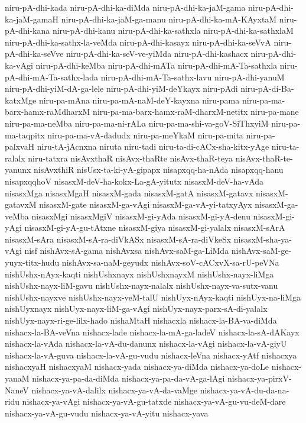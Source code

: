 {niru-pA-dhi-kada
niru-pA-dhi-ka-diMda
niru-pA-dhi-ka-jaM-gama
niru-pA-dhi-ka-jaM-gamaH
niru-pA-dhi-ka-jaM-ga-manu
niru-pA-dhi-ka-mA-KAyxtaM
niru-pA-dhi-kana
niru-pA-dhi-kanu
niru-pA-dhi-ka-sathxla
niru-pA-dhi-ka-sathxlaM
niru-pA-dhi-ka-sathx-la-veMda
niru-pA-dhi-kasayx
niru-pA-dhi-ka-seVvA
niru-pA-dhi-ka-seVve
niru-pA-dhi-ka-seV-ve-yiMda
niru-pA-dhi-kashacx
niru-pA-dhi-ka-vAgi
niru-pA-dhi-keMba
niru-pA-dhi-mATa
niru-pA-dhi-mA-Ta-sathxla
niru-pA-dhi-mA-Ta-sathx-lada
niru-pA-dhi-mA-Ta-sathx-lavu
niru-pA-dhi-yanuM
niru-pA-dhi-yiM-dA-ga-lele
niru-pA-dhi-yiM-deYkayx
niru-pAdi
niru-pA-di-Ba-katxMge
niru-pa-mAna
niru-pa-mA-naM-deY-kayxna
niru-pama
niru-pa-ma-barx-hamx-raMdharxM
niru-pa-ma-barx-hamx-raM-dharxM-netitx
niru-pa-mane
niru-pa-ma-neMba
niru-pa-ma-ni-rALa
niru-pa-ma-shi-va-goV-SiThxyiM
niru-pa-ma-taqpitx
niru-pa-ma-vA-dadudx
niru-pa-meYkaM
niru-pa-mita
niru-pa-palxvaH
niru-tA-jAcnxna
niruta
niru-tadi
niru-ta-di-cACx-sha-kitx-yAge
niru-ta-ralalx
niru-tatxra
nisAvxthaR
nisAvx-thaRte
nisAvx-thaR-teya
nisAvx-thaR-te-yanunx
nisAvxthiR
nisUsx-ta-ki-yA-gipapx
nisapxqq-ha-nAda
nisapxqq-hanu
nisapxqqhoV
nisasxM-deV-ha-kokx-La-gA-yitutx
nisasxM-deV-ha-vAda
nisasxMga
nisasxMgaH
nisasxM-gada
nisasxM-gatA
nisasxM-gatavx
nisasxM-gatavxM
nisasxM-gate
nisasxM-ga-vAgi
nisasxM-ga-vA-yi-tatxyAyx
nisasxM-ga-veMba
nisasxMgi
nisasxMgiV
nisasxM-gi-yAda
nisasxM-gi-yA-denu
nisasxM-gi-yAgi
nisasxM-gi-yA-gu-tAtxne
nisasxM-giya
nisasxM-gi-yalalx
nisasxM-sArA
nisasxM-sAra
nisasxM-sA-ra-diVkASx
nisasxM-sA-ra-diVkeSx
nisasxM-sha-ya-vAgi
nisf
nishAvx-sA-gama
nishAvxsa
nishAvx-saM-ga-LiMda
nishAvx-saM-ge-yuyx-titx-hudu
nishAvx-sa-naM-geyudx
nishAvx-soV-cACxvX-sa-rU-peVNa
nishUshx-nAyx-kaqti
nishUshxnayx
nishUshxnayxM
nishUshx-nayx-liMga
nishUshx-nayx-liM-gavu
nishUshx-nayx-nalalx
nishUshx-nayx-va-sutx-vanu
nishUshx-nayxve
nishUshx-nayx-veM-talU
nishUyx-nAyx-kaqti
nishUyx-na-liMga
nishUyxnayx
nishUyx-nayx-liM-ga-vAgi
nishUyx-nayx-parx-sA-di-yalalx
nishUyx-nayx-ri-ge-lilx-hado
nishaMtaH
nishacxla
nishacx-la-BA-va-diMda
nishacx-la-BA-veVna
nishacx-lade
nishacx-la-mA-ga-ladeV
nishacx-la-sA-dAKayx
nishacx-la-vAda
nishacx-la-vA-du-danunx
nishacx-la-vAgi
nishacx-la-vA-giyU
nishacx-la-vA-guva
nishacx-la-vA-gu-vudu
nishacx-leVna
nishacx-yAtf
nishacxya
nishacxyaH
nishacxyaM
nishacx-yada
nishacx-ya-diMda
nishacx-ya-doLe
nishacx-yanaM
nishacx-ya-pa-da-diMda
nishacx-ya-pa-da-vA-ga-lAgi
nishacx-ya-pirxV-NaneV
nishacx-ya-vA-dalilx
nishacx-ya-vA-da-vaMge
nishacx-ya-vA-du-da-na-ridu
nishacx-ya-vAgi
nishacx-ya-vA-gu-tatxde
nishacx-ya-vA-gu-vu-deM-dare
nishacx-ya-vA-gu-vudu
nishacx-ya-vA-yitu
nishacx-yava
}
